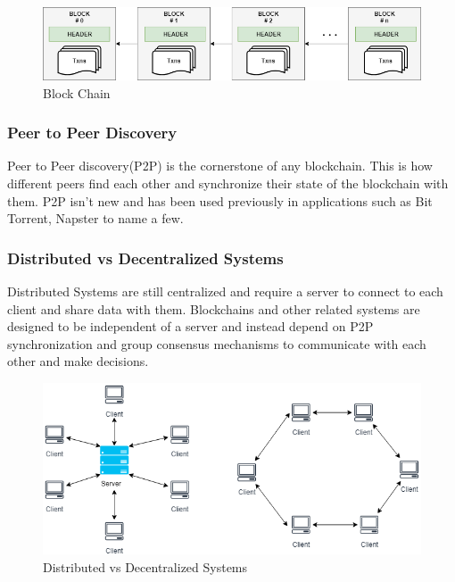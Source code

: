 \documentclass[11pt,openright]{report}
\begin{document}
\begin{figure}
	\centering
	\includegraphics[scale=0.5]{images/Blockchain.png}
	\caption{Block Chain}
	\label{fig:Chained Blocks}
\end{figure}

\subsubsection{Peer to Peer Discovery}
Peer to Peer discovery(P2P) is the cornerstone of any blockchain. This is how different peers find each other and synchronize their state of the blockchain with them. P2P isn't new and has been used previously in applications such as Bit Torrent, Napster to name a few.

\subsubsection{Distributed vs Decentralized Systems}
Distributed Systems are still centralized and require a server to connect to each client and share data with them. Blockchains and other related systems are designed to be independent of a server and instead depend on P2P synchronization and group consensus mechanisms to communicate with each other and make decisions.

\begin{figure}
	\centering
	\includegraphics[scale=0.5]{images/Decentralized.png}
	\caption{Distributed vs Decentralized Systems}
	\label{fig:Decentralized_Systems}
\end{figure}
\end{document}
